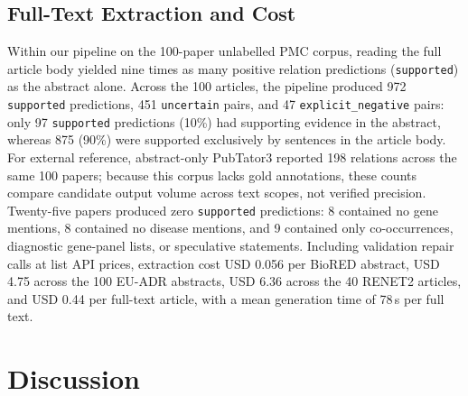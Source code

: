 \documentclass[preprint,10pt,letterpaper]{elsarticle}
\newcommand{\st}[1]{\texttt{#1}}             %
\begin{document}
\subsection{Full-Text Extraction and Cost}
Within our pipeline on the 100-paper unlabelled PMC corpus, reading the full article body yielded nine times as many positive relation predictions (\st{supported}) as the abstract alone. Across the 100 articles, the pipeline produced 972 \st{supported} predictions, 451 \st{uncertain} pairs, and 47 \st{explicit\_negative} pairs: only 97 \st{supported} predictions (10\%) had supporting evidence in the abstract, whereas 875 (90\%) were supported exclusively by sentences in the article body. For external reference, abstract-only PubTator3 reported 198 relations across the same 100 papers; because this corpus lacks gold annotations, these counts compare candidate output volume across text scopes, not verified precision. Twenty-five papers produced zero \st{supported} predictions: 8 contained no gene mentions, 8 contained no disease mentions, and 9 contained only co-occurrences, diagnostic gene-panel lists, or speculative statements. Including validation repair calls at list API prices, extraction cost USD 0.056 per BioRED abstract, USD 4.75 across the 100 EU-ADR abstracts, USD 6.36 across the 40 RENET2 articles, and USD 0.44 per full-text article, with a mean generation time of 78\,s per full text.

\section{Discussion}
\end{document}
